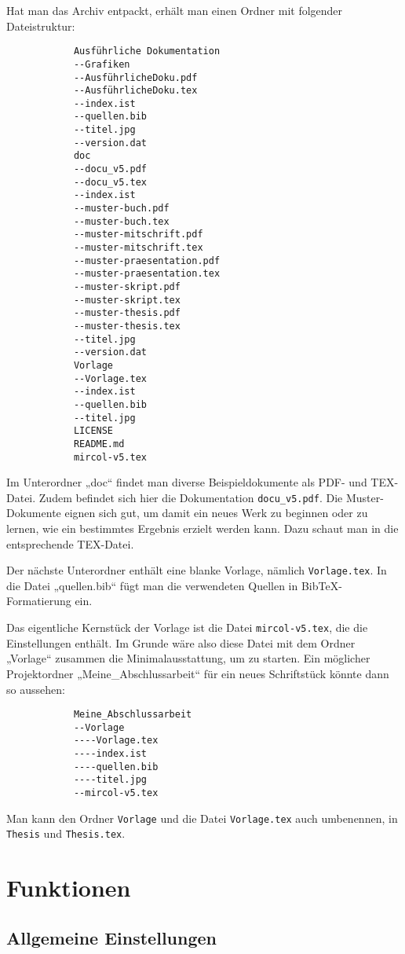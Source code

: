 			Hat man das Archiv entpackt, erhält man einen Ordner mit folgender Dateistruktur:

			\begin{verbatim}
			Ausführliche Dokumentation
			--Grafiken
			--AusführlicheDoku.pdf
			--AusführlicheDoku.tex
			--index.ist
			--quellen.bib
			--titel.jpg
			--version.dat
			doc
			--docu_v5.pdf
			--docu_v5.tex
			--index.ist
			--muster-buch.pdf
			--muster-buch.tex
			--muster-mitschrift.pdf
			--muster-mitschrift.tex
			--muster-praesentation.pdf
			--muster-praesentation.tex
			--muster-skript.pdf
			--muster-skript.tex
			--muster-thesis.pdf
			--muster-thesis.tex
			--titel.jpg
			--version.dat
			Vorlage
			--Vorlage.tex
			--index.ist
			--quellen.bib
			--titel.jpg
			LICENSE
			README.md
			mircol-v5.tex
			\end{verbatim}

			Im Unterordner „doc“ findet man diverse Beispieldokumente als PDF- und TEX-Datei. Zudem befindet sich hier die Dokumentation \texttt{docu\_v5.pdf}. Die Muster-Dokumente eignen sich gut, um damit ein neues Werk zu beginnen oder zu lernen, wie ein bestimmtes Ergebnis erzielt werden kann. Dazu schaut man in die entsprechende TEX-Datei.

			Der nächste Unterordner enthält eine blanke Vorlage, nämlich \texttt{Vorlage.tex}. In die Datei „quellen.bib“ fügt man die verwendeten Quellen in BibTeX-Formatierung ein.

			Das eigentliche Kernstück der Vorlage ist die Datei \texttt{mircol-v5.tex}, die die Einstellungen enthält. Im Grunde wäre also diese Datei mit dem Ordner „Vorlage“ zusammen die Minimalausstattung, um zu starten. Ein möglicher Projektordner „Meine\_Abschlussarbeit“ für ein neues Schriftstück könnte dann so aussehen:



			\begin{verbatim}
			Meine_Abschlussarbeit
			--Vorlage
			----Vorlage.tex
			----index.ist
			----quellen.bib
			----titel.jpg
			--mircol-v5.tex
			\end{verbatim}

			Man kann den Ordner \texttt{Vorlage} und die Datei \texttt{Vorlage.tex} auch umbenennen, \zb in \texttt{Thesis} und \texttt{Thesis.tex}.

	\chapter{Funktionen}

		\section{Allgemeine Einstellungen}

